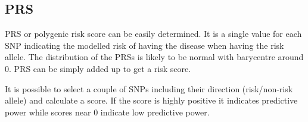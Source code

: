 \documentclass[letterpaper, 11pt]{article}
\begin{document}
\subsection{PRS}
PRS or polygenic risk score can be easily determined. It is a single value for each SNP indicating the modelled risk of having the disease when having the risk allele. The distribution of the PRSs is likely to be normal with barycentre around 0. PRS can be simply added up to get a risk score. 
\begin{figure} [!h] \end{figure}

It is possible to select a couple of SNPs including their direction (risk/non-risk allele) and calculate a score. If the score is highly positive it indicates predictive power while scores near 0 indicate low predictive power.\\


\begin{figure} [!h] \end{figure}
\end{document}
